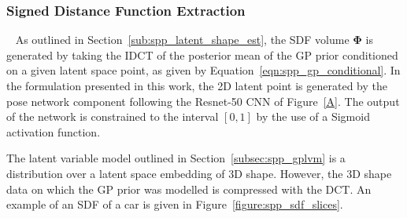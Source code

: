 \subsubsection{Signed Distance Function Extraction}
~\label{subsubsec:sdf_extraction}
As outlined in Section~\ref{sub:spp_latent_shape_est}, the SDF volume \( \bm{\Phi} \) 
is generated by taking the IDCT of the posterior mean of the GP prior conditioned on 
a given latent space point, as given by Equation~\ref{eqn:spp_gp_conditional}. In the 
formulation presented in this work, the 2D latent point is generated by the pose 
network component following the Resnet-50 CNN of Figure~\ref{A}. The output of the network 
is constrained to the interval \( [0, 1] \) by the use of a Sigmoid activation function.

The latent variable model outlined in Section~\ref{subsec:spp_gplvm} is a distribution 
over a latent space embedding of 3D shape. However, the 3D shape data on which the GP 
prior was modelled is compressed with the DCT\@. An example of an SDF of a car is given 
in Figure~\ref{figure:spp_sdf_slices}.
